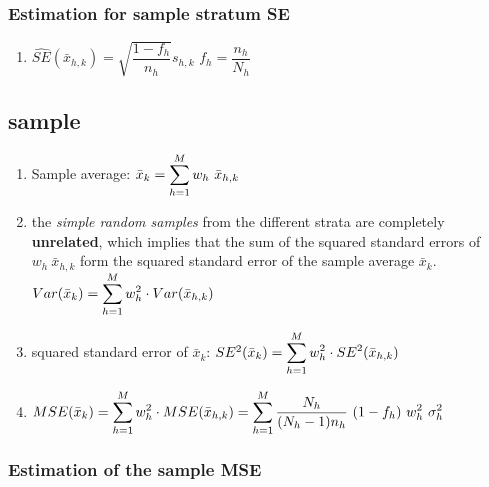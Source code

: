 \subsubsection{Estimation for sample stratum SE}
\begin{enumerate}[itemsep=0.3cm]
    \item $
        \hat{SE}(\bar{x}_{h,k})
        = \sqrt{\dfrac{1 - f_h}{n_h}} s_{h,k}
    $
    \hfill
    $f_h = \dfrac{n_h}{N_h}$
    \hfill \cite{statistics/book/Statistics-for-Data-Scientists/Maurits-Kaptein}
\end{enumerate}



\subsection{sample}
\begin{enumerate}[itemsep=0.2cm]
    \item Sample average: $
        \bar{x}_k = \displaystyle\sum^M_{h=1} w_h\ \bar{x}_{h,k}
    $
    \hfill \cite{statistics/book/Statistics-for-Data-Scientists/Maurits-Kaptein}

    \item the \textit{simple random samples} from the different strata are completely \textbf{unrelated}, which implies that the sum of the squared standard errors of $w_h \ \bar{x}_{h,k}$ form the squared standard error of the sample average $\bar{x}_k$.
    \hfill \cite{statistics/book/Statistics-for-Data-Scientists/Maurits-Kaptein}
    \\
    $
        Var(\bar{x}_k) = \displaystyle\sum_{h=1}^M w_h^2 \cdot Var(\bar{x}_{h,k})
    $
    \hfill \cite{common/online/chatgpt}
    
    
    \item squared standard error of $\bar{x}_k$: 
    $
        SE^2(\bar{x}_k) = \displaystyle\sum_{h=1}^M w_h^2 \cdot SE^2(\bar{x}_{h,k})
    $
    \hfill \cite{common/online/chatgpt}

    \item $
        MSE(\bar{x}_k ) 
        = \dsum^M_{h=1} w^2_h \cdot MSE(\bar{x}_{h,k} ) 
        = \dsum^M_{h=1} \dfrac{N_h}{(N_h - 1)n_h} \ (1 - f_h)\ w^2_h\ \sigma^2_h$
    \hfill \cite{statistics/book/Statistics-for-Data-Scientists/Maurits-Kaptein}

\end{enumerate}


\subsubsection{Estimation of the sample MSE}

